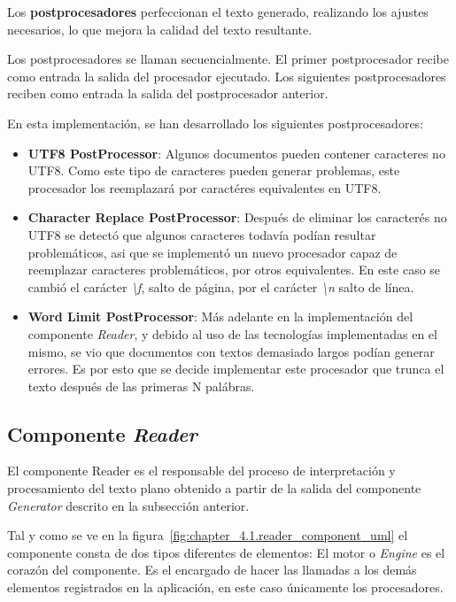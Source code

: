 Los \textbf{postprocesadores} perfeccionan el texto generado, realizando los ajustes necesarios, lo que mejora la
calidad del texto resultante.

Los postprocesadores se llaman secuencialmente.
El primer postprocesador recibe como entrada la salida del procesador ejecutado.
Los siguientes postprocesadores reciben como entrada la salida del postprocesador anterior.

En esta implementación, se han desarrollado los siguientes postprocesadores:

\begin{itemize}
    \item \textbf{UTF8 PostProcessor}: Algunos documentos pueden contener caracteres no UTF8. Como este tipo de
    caracteres pueden generar problemas, este procesador los reemplazará por caractéres equivalentes en UTF8.
    \item \textbf{Character Replace PostProcessor}: Después de eliminar los caracterés no UTF8 se detectó que algunos
    caracteres todavía podían resultar problemáticos, asi que se implementó un nuevo procesador capaz de reemplazar
    caracteres problemáticos, por otros equivalentes.
    En este caso se cambió el carácter \textit{\textbackslash f}, salto de página, por el carácter
    \textit{\textbackslash n} salto de línea.
    \item \textbf{Word Limit PostProcessor}: Más adelante en la implementación del componente \textit{Reader}, y debido
    al uso de las tecnologías implementadas en el mismo, se vio que documentos con textos demasiado largos podían
    generar errores.
    Es por esto que se decide implementar este procesador que trunca el texto después de las primeras N palábras.
\end{itemize}

\subsection*{Componente \textit{Reader}}\label{subsec:chapter_4.reader_component}
El componente Reader es el responsable del proceso de interpretación y procesamiento del texto plano obtenido a
partir de la salida del componente \textit{Generator} descrito en la subsección anterior.

Tal y como se ve en la figura~\ref{fig:chapter_4.1.reader_component_uml} el componente consta de dos tipos diferentes de
elementos: El motor o \textit{Engine} es el corazón del componente.
Es el encargado de hacer las llamadas a los demás elementos registrados en la aplicación, en este caso únicamente los
procesadores.

